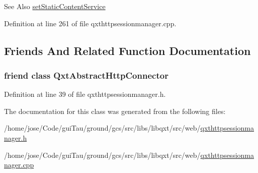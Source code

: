 \begin{DoxySeeAlso}{See Also}
\hyperlink{class_qxt_http_session_manager_a2fbe3f7c2bbe85c90deca2843b5b8610}{set\-Static\-Content\-Service} 
\end{DoxySeeAlso}


Definition at line 261 of file qxthttpsessionmanager.\-cpp.



\subsection{Friends And Related Function Documentation}
\hypertarget{class_qxt_http_session_manager_a09c9a20cde2bc4b51280cff5807a1bc8}{
\subsubsection[{Qxt\-Abstract\-Http\-Connector}]{\setlength{\rightskip}{0pt plus 5cm}friend class {\bf Qxt\-Abstract\-Http\-Connector}\hspace{0.3cm}{\ttfamily [friend]}}}\label{class_qxt_http_session_manager_a09c9a20cde2bc4b51280cff5807a1bc8}


Definition at line 39 of file qxthttpsessionmanager.\-h.



The documentation for this class was generated from the following files\-:\begin{DoxyCompactItemize}
\item 
/home/jose/\-Code/gui\-Tau/ground/gcs/src/libs/libqxt/src/web/\hyperlink{qxthttpsessionmanager_8h}{qxthttpsessionmanager.\-h}\item 
/home/jose/\-Code/gui\-Tau/ground/gcs/src/libs/libqxt/src/web/\hyperlink{qxthttpsessionmanager_8cpp}{qxthttpsessionmanager.\-cpp}\end{DoxyCompactItemize}

